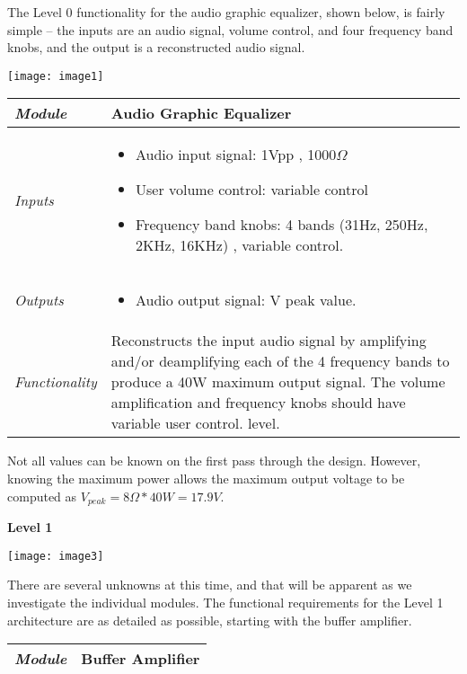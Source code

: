 \begin{enumerate}
\begin{onlysolution}
    The Level 0 functionality for the audio graphic equalizer, shown below, 
    is fairly simple – the inputs are an audio signal, volume control, and 
    four frequency band knobs, and the output is a reconstructed audio signal.

\texttt{[image: image1]}

\begin{tabular}{|l|m{10cm}|}
\hline
\emph{Module} & Audio Graphic Equalizer \\ \hline

\emph{Inputs} & 
\begin{itemize}
\item Audio input signal: 1Vpp , 1000$\Omega$
\item User volume control: variable control
\item Frequency band knobs: 4 bands (31Hz, 250Hz, 2KHz, 16KHz) , variable control.
\end{itemize} \\ \hline

\emph{Outputs} & 
\begin{itemize}
\item
  Audio output signal: \textul{?}V peak value.
\end{itemize}  \\ \hline

\emph{Functionality} & 
Reconstructs the input audio signal by amplifying and/or deamplifying each
of the 4 frequency bands to produce a 40W maximum output signal. The
volume amplification and frequency knobs should have variable user
control.
level. \\ \hline
\end{tabular}



Not all values can be known on the first pass through the design. However,
knowing the maximum power allows the maximum output voltage to be
computed as $V_{peak} = 8\Omega*40W = 17.9V$.

\textbf{Level 1}

\texttt{[image: image3]}

There are several unknowns at this time, and that will be apparent as we
investigate the individual modules. The functional requirements for the Level 1
architecture are as detailed as possible, starting with the buffer amplifier.


\begin{tabular}{|l|m{10cm}|}
\hline
\emph{Module} &Buffer Amplifier\\ \hline


\end{tabular}
\end{onlysolution}
\end{enumerate}
